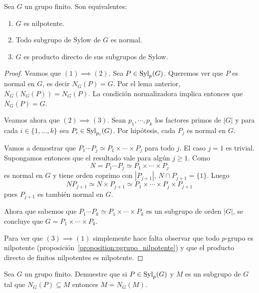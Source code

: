 \begin{theorem}
	\label{theorem:nilpotente:eq}
	Sea $G$ un grupo finito. Son equivalentes:
	\begin{enumerate}
		\item $G$ es nilpotente.
		\item Todo subgrupo de Sylow de $G$ es normal.
		\item $G$ es producto directo de sus subgrupos de Sylow.
	\end{enumerate}
\end{theorem}

\begin{proof}
	Veamos que $(1)\implies(2)$. Sea $P\in\mathrm{Syl}_p(G)$. Queremos ver que $P$ es
	normal en $G$, es decir $N_G(P)=G$.  Por el lema anterior, 
	$N_G(N_G(P))=N_G(P)$. La condición normalizadora implica entonces que $N_G(P)=G$.

	Veamos ahora que $(2)\implies(3)$. Sean $p_1,\cdots,p_k$ los factores
	primos de $|G|$ y para cada $i\in\{1,\dots,k\}$ sea $P_i\in\mathrm{Syl}_{p_i}(G)$.
	Por hipótesis, cada $P_j$ es normal en $G$.

	Vamos a demostrar que $P_1\cdots P_j\simeq P_1\times\cdots\times P_j$ para todo $j$.
	El caso $j=1$ es trivial. Supongamos entonces que el resultado vale para
	algún $j\geq 1$. Como 
	\[
	N=P_1\cdots P_j\simeq P_1\times\cdots\times P_j
	\]
	es normal en $G$ y tiene orden coprimo con $|P_{j+1}|$, $N\cap
	P_{j+1}=\{1\}$. Luego
	\[
		NP_{j+1}\simeq N\times P_{j+1}\simeq P_1\times\cdots\times P_j\times P_{j+1}
	\]
	pues $P_{j+1}$ es también normal en $G$. 

	Ahora que sabemos que $P_1\cdots P_k\simeq P_1\times\cdots\times P_k$ es un
	subgrupo de orden $|G|$, se concluye que $G=P_1\times\cdots\times P_k$.

	Para ver que $(3)\implies(1)$ simplemente hace falta observar que todo
	$p$-grupo es nilpotente (proposición~\ref{proposition:pgrupo_nilpotente}) y
	que el producto directo de finitos nilpotentes es nilpotente.
\end{proof}

\begin{exercise}
	\label{xca:truco}
	Sea $G$ un grupo finito. Demuestre que si $P\in\mathrm{Syl}_p(G)$ y $M$ es un subgrupo de $G$ tal que
	$N_G(P)\subseteq M$ entonces $M=N_G(M)$. 
\end{exercise}


